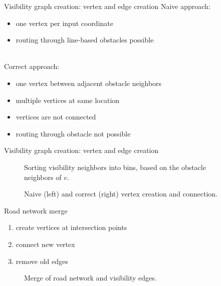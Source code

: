 \documentclass[xcolor={x11names}]{beamer}
\newcommand{\nn}{\hfill\\[2ex]}
\newenvironment{figcenter}
{%
	\parskip=0pt%
	\par%
	\nopagebreak%
	\centering%
}%
{%
	\par%
	\noindent%
	\ignorespacesafterend%
}
\begin{document}
		\begin{frame}{Visibility graph creation: vertex and edge creation}
			Naive approach:
			\begin{itemize}
				\item one vertex per input coordinate
				\item routing through line-based obstacles possible
			\end{itemize}
			\nn
			\pause
			Correct approach:
			\begin{itemize}
				\item one vertex between adjacent obstacle neighbors
				\item multiple vertices at same location
				\item vertices are not connected
				\item routing through obstacle not possible
			\end{itemize}
		\end{frame}
	
		\begin{frame}{Visibility graph creation: vertex and edge creation}
			\begin{figure}
				\begin{figcenter}
					\scalebox{0.7}
					{
						
					}
				\end{figcenter}
				\caption{Sorting visibility neighbors into bins, based on the obstacle neighbors of $v$.}
			\end{figure}
			\pause
			\begin{figure}
				\begin{figcenter}
					\scalebox{0.7}
					{
						
					}
					\hspace{0.75cm}
					\scalebox{0.7}
					{
						
					}
				\end{figcenter}
				\caption{Naive (left) and correct (right) vertex creation and connection.}
			\end{figure}
		\end{frame}
		
		\begin{frame}{Road network merge}
			\begin{enumerate}
				\item create vertices at intersection points
				\item connect new vertex
				\item remove old edges
			\end{enumerate}
			\begin{figure}
				\begin{figcenter}
					\scalebox{0.7}
					{
						
					}
					\hspace{0.75cm}
					\scalebox{0.7}
					{
						
					}
				\end{figcenter}
				\caption{Merge of road network and visibility edges.}
			\end{figure}
		\end{frame}
		
\end{document}

